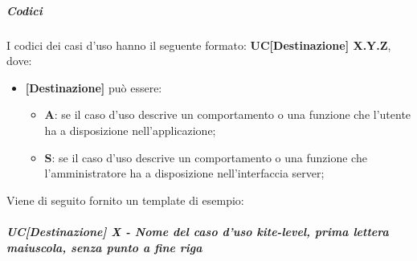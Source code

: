 \subparagraph{Codici}
I codici dei casi d'uso hanno il seguente formato: \textbf{UC[Destinazione] X.Y.Z}, dove:
\begin{itemize}
	\item \textbf{[Destinazione]} può essere:
		\begin{itemize}
			\item \textbf{A}: se il caso d’uso descrive un comportamento o una funzione che l’utente ha a disposizione nell'applicazione;
			\item \textbf{S}: se il caso d’uso descrive un comportamento o una funzione che l'amministratore ha a disposizione nell'interfaccia server;
		\end{itemize}
\end{itemize}
Viene di seguito fornito un template di esempio:
\subparagraph{UC[Destinazione] X - Nome del caso d'uso kite-level, prima lettera maiuscola, senza punto a fine riga} %
